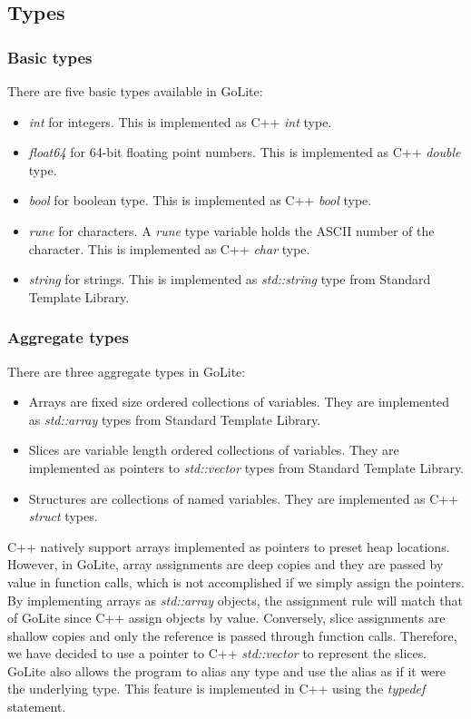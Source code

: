 \documentclass[a4paper]{article}
\begin{document}
\subsection{Types}
\subsubsection{Basic types}
There are five basic types available in GoLite:
\begin{itemize}
\item \textit{int} for integers. This is implemented as C++ \textit{int} type.
\item \textit{float64} for 64-bit floating point numbers. This is implemented as C++ \textit{double} type.
\item \textit{bool} for boolean type. This is implemented as C++ \textit{bool} type.
\item \textit{rune} for characters. A \textit{rune} type variable holds the ASCII number of the character. This is implemented as C++ \textit{char} type.
\item \textit{string} for strings. This is implemented as \textit{std::string} type from Standard Template Library.
\end{itemize}
\subsubsection{Aggregate types}
There are three aggregate types in GoLite:
\begin{itemize}
\item Arrays are fixed size ordered collections of variables. They are implemented as \textit{std::array} types from Standard Template Library.
\item Slices are variable length ordered collections of variables. They are implemented as pointers to \textit{std::vector} types from Standard Template Library.
\item Structures are collections of named variables. They are implemented as C++ \textit{struct} types. 
\end{itemize}
C++ natively support arrays implemented as pointers to preset heap locations. However, in GoLite, array assignments are deep copies and they are passed by value in function calls, which is not accomplished if we simply assign the pointers. By implementing arrays as \textit{std::array} objects, the assignment rule will match that of GoLite since C++ assign objects by value. Conversely, slice assignments are shallow copies and only the reference is passed through function calls. Therefore, we have decided to use a pointer to C++ \textit{std::vector} to represent the slices.\\
GoLite also allows the program to alias any type and use the alias as if it were the underlying type. This feature is implemented in C++ using the \textit{typedef} statement.
\end{document}
